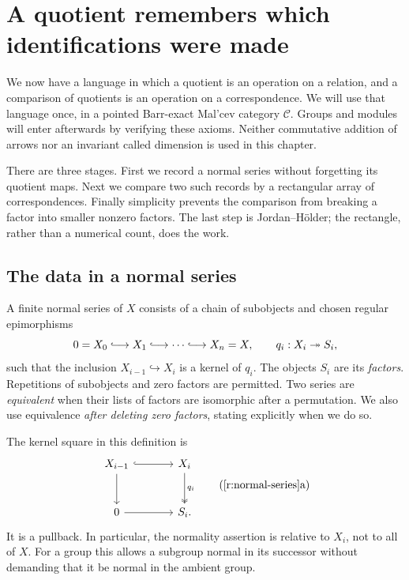 \section{A quotient remembers which identifications were made}
\label{r:chapter}

We now have a language in which a quotient is an operation on a relation,
and a comparison of quotients is an operation on a correspondence.  We will
use that language once, in a pointed Barr-exact Mal'cev category
$\mathcal C$.  Groups and modules will enter afterwards by verifying these
axioms.  Neither commutative addition of arrows nor an invariant called
dimension is used in this chapter.

There are three stages.  First we record a normal series without forgetting
its quotient maps.  Next we compare two such records by a rectangular array
of correspondences.  Finally simplicity prevents the comparison from
breaking a factor into smaller nonzero factors.  The last step is
Jordan--H\"older; the rectangle, rather than a numerical count, does the work.

\subsection{The data in a normal series}

\begin{definition}
\label{r:normal-series}
A finite normal series of $X$ consists of a chain of subobjects and chosen
regular epimorphisms
\[
  0=X_0\lhook\joinrel\longrightarrow X_1
  \lhook\joinrel\longrightarrow\cdots
  \lhook\joinrel\longrightarrow X_n=X,
  \qquad q_i:X_i\twoheadrightarrow S_i,
\]
such that the inclusion $X_{i-1}\hookrightarrow X_i$ is a kernel of $q_i$.
The objects $S_i$ are its \emph{factors}.  Repetitions of subobjects and zero
factors are permitted.  Two series are \emph{equivalent} when their lists of
factors are isomorphic after a permutation.  We also use equivalence
\emph{after deleting zero factors}, stating explicitly when we do so.
\end{definition}

The kernel square in this definition is
\[
\begin{tikzcd}[column sep=large,row sep=large]
X_{i-1}\arrow[r,hook]\arrow[d] & X_i\arrow[d,two heads,"q_i"]\\
0\arrow[r] & S_i .
\end{tikzcd}
\tag{\ref{r:normal-series}a}
\]
It is a pullback.  In particular, the normality assertion is relative to
$X_i$, not to all of $X$.  For a group this allows a subgroup normal in its
successor without demanding that it be normal in the ambient group.

